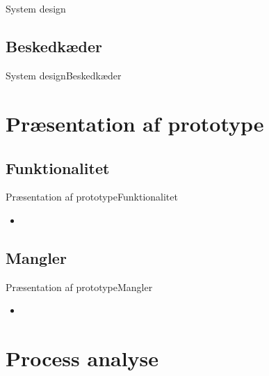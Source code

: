 \documentclass[10pt]{beamer}
\begin{document}
        \subsection{}
        \begin{frame}{System design}{}
            \begin{block}{}
            
            \end{block}
        \end{frame}
        
        \subsection{Beskedkæder}
        \begin{frame}{System design}{Beskedkæder}
            
        \end{frame}
    
    \section{Præsentation af prototype}
        \subsection{Funktionalitet}
        \begin{frame}{Præsentation af prototype}{Funktionalitet}
            \begin{itemize}
                \item 
            \end{itemize}
        \end{frame}
        \subsection{Mangler}
        \begin{frame}{Præsentation af prototype}{Mangler}
            \begin{itemize}
                \item 
            \end{itemize}
        \end{frame}
    
    \section{Process analyse}
\end{document}
